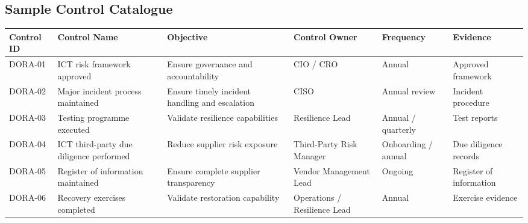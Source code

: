 \documentclass[
  letterpaper,
  DIV=11,
  numbers=noendperiod]{scrartcl}
\begin{document}
\subsection{Sample Control Catalogue}\label{sample-control-catalogue}

\begin{longtable}[]{@{}
  >{\raggedright\arraybackslash}p{}
  >{\raggedright\arraybackslash}p{}
  >{\raggedright\arraybackslash}p{}
  >{\raggedright\arraybackslash}p{}
  >{\raggedright\arraybackslash}p{}
  >{\raggedright\arraybackslash}p{}@{}}
\toprule\noalign{}
\begin{minipage}[b]{\linewidth}\raggedright
Control ID
\end{minipage} & \begin{minipage}[b]{\linewidth}\raggedright
Control Name
\end{minipage} & \begin{minipage}[b]{\linewidth}\raggedright
Objective
\end{minipage} & \begin{minipage}[b]{\linewidth}\raggedright
Control Owner
\end{minipage} & \begin{minipage}[b]{\linewidth}\raggedright
Frequency
\end{minipage} & \begin{minipage}[b]{\linewidth}\raggedright
Evidence
\end{minipage} \\
\midrule\noalign{}
\endhead
\bottomrule\noalign{}
\endlastfoot
DORA-01 & ICT risk framework approved & Ensure governance and
accountability & CIO / CRO & Annual & Approved framework \\
DORA-02 & Major incident process maintained & Ensure timely incident
handling and escalation & CISO & Annual review & Incident procedure \\
DORA-03 & Testing programme executed & Validate resilience capabilities
& Resilience Lead & Annual / quarterly & Test reports \\
DORA-04 & ICT third-party due diligence performed & Reduce supplier risk
exposure & Third-Party Risk Manager & Onboarding / annual & Due
diligence records \\
DORA-05 & Register of information maintained & Ensure complete supplier
transparency & Vendor Management Lead & Ongoing & Register of
information \\
DORA-06 & Recovery exercises completed & Validate restoration capability
& Operations / Resilience Lead & Annual & Exercise evidence \\
\end{longtable}
\end{document}
